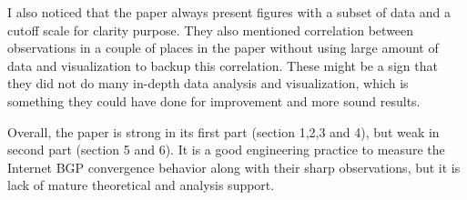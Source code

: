 \documentclass[11pt]{article}
\begin{document}
\vspace{0.5em}
I also noticed that the paper always
present figures with a subset of data and a cutoff scale for clarity
purpose. They also mentioned correlation between observations in a
couple of places in the paper without using large amount of data and
visualization to 
backup this correlation. These might be a sign that they did not do
many in-depth data analysis and visualization, which is something they
could have done for improvement and more sound results.

\vspace{0.5em}
Overall, the paper is strong in its first part (section 1,2,3 and 4),
but weak in second part (section 5 and 6). It is a good engineering
practice to measure the Internet BGP convergence behavior along with
their sharp observations, but it is lack of mature theoretical and
analysis support.
\end{document}
